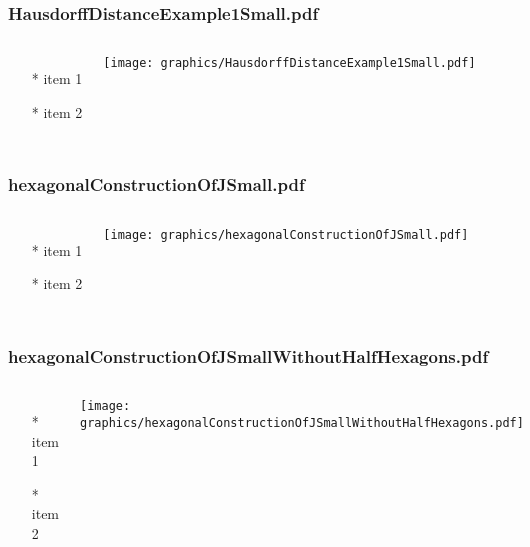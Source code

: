 \documentclass{beamer}
\begin{document}
\begin{frame} \frametitle{HausdorffDistanceExample1Small.pdf}
    \begin{columns}[c]
        \begin{itemize}
            \item[*] item 1
            \item[*] item 2
        \end{itemize}
        \begin{minipage}{\linewidth}
            \begin{center}
            \texttt{[image: graphics/HausdorffDistanceExample1Small.pdf]}
            \label{gfx:HausdorffDistanceExample1Small.pdf}
            \end{center}
        \end{minipage}
    \end{columns}
\end{frame}
\begin{frame} \frametitle{hexagonalConstructionOfJSmall.pdf}
    \begin{columns}[c]
        \begin{itemize}
            \item[*] item 1
            \item[*] item 2
        \end{itemize}
        \begin{minipage}{\linewidth}
            \begin{center}
            \texttt{[image: graphics/hexagonalConstructionOfJSmall.pdf]}
            \label{gfx:hexagonalConstructionOfJSmall.pdf}
            \end{center}
        \end{minipage}
    \end{columns}
\end{frame}
\begin{frame} \frametitle{hexagonalConstructionOfJSmallWithoutHalfHexagons.pdf}
    \begin{columns}[c]
        \begin{itemize}
            \item[*] item 1
            \item[*] item 2
        \end{itemize}
        \begin{minipage}{\linewidth}
            \begin{center}
            \texttt{[image: graphics/hexagonalConstructionOfJSmallWithoutHalfHexagons.pdf]}
            \label{gfx:hexagonalConstructionOfJSmallWithoutHalfHexagons.pdf}
            \end{center}
        \end{minipage}
    \end{columns}
\end{frame}
\end{document}
